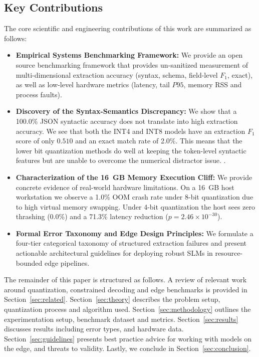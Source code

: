 \documentclass[conference]{IEEEtran}
\begin{document}
\subsection{Key Contributions}
The core scientific and engineering contributions of this work are summarized as follows:
\begin{itemize}
    \item \textbf{Empirical Systems Benchmarking Framework:} We provide an open source benchmarking framework that provides un-sanitized measurement of multi-dimensional extraction accuracy (syntax, schema, field-level $F_1$, exact), as well as low-level hardware metrics (latency, tail $P95$, memory RSS and process faults).
    \item \textbf{Discovery of the Syntax-Semantics Discrepancy:} We show that a 100.0\% JSON syntactic accuracy does not translate into high extraction accuracy. We see that both the INT4 and INT8 models have an extraction $F_1$ score of only $0.510$ and an exact match rate of 2.0\%. This means that the lower bit quantization methods do well at keeping the token-level syntactic features but are unable to overcome the numerical distractor issue. .
    \item \textbf{Characterization of the 16~GB Memory Execution Cliff:} We provide concrete evidence of real-world hardware limitations. On a 16~GB host workstation we observe a 1.0\% OOM crash rate under 8-bit quantization due to high virtual memory swapping. Under 4-bit quantization the host sees zero thrashing (0.0\%) and a 71.3\% latency reduction ($p = 2.46 \times 10^{-30}$).
    \item \textbf{Formal Error Taxonomy and Edge Design Principles:} We formulate a four-tier categorical taxonomy of structured extraction failures and present actionable architectural guidelines for deploying robust SLMs in resource-bounded edge pipelines.
\end{itemize}


The remainder of this paper is structured as follows. A review of relevant work around quantization, constrained decoding and edge benchmarks is provided in Section~\ref{sec:related}. Section~\ref{sec:theory} describes the problem setup, quantization process and algorithm used. Section~\ref{sec:methodology} outlines the experimentation setup, benchmark dataset and metrics. Section~\ref{sec:results} discusses results including error types, and hardware data. Section~\ref{sec:guidelines} presents best practice advice for working with models on the edge, and threats to validity. Lastly, we conclude in Section~\ref{sec:conclusion}.
\end{document}
